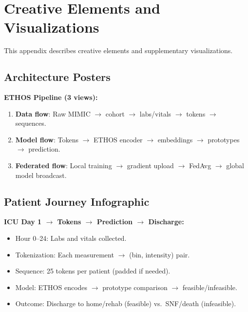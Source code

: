 \chapter{Creative Elements and Visualizations}
\label{app:creative}

This appendix describes creative elements and supplementary visualizations.

\section{Architecture Posters}

\textbf{ETHOS Pipeline (3 views):}
\begin{enumerate}
\item \textbf{Data flow}: Raw MIMIC $\to$ cohort $\to$ labs/vitals $\to$ tokens $\to$ sequences.
\item \textbf{Model flow}: Tokens $\to$ ETHOS encoder $\to$ embeddings $\to$ prototypes $\to$ prediction.
\item \textbf{Federated flow}: Local training $\to$ gradient upload $\to$ FedAvg $\to$ global model broadcast.
\end{enumerate}

\section{Patient Journey Infographic}

\textbf{ICU Day 1 $\to$ Tokens $\to$ Prediction $\to$ Discharge:}
\begin{itemize}
\item Hour 0--24: Labs and vitals collected.
\item Tokenization: Each measurement $\to$ (bin, intensity) pair.
\item Sequence: 25 tokens per patient (padded if needed).
\item Model: ETHOS encodes $\to$ prototype comparison $\to$ feasible/infeasible.
\item Outcome: Discharge to home/rehab (feasible) vs.\ SNF/death (infeasible).
\end{itemize}

